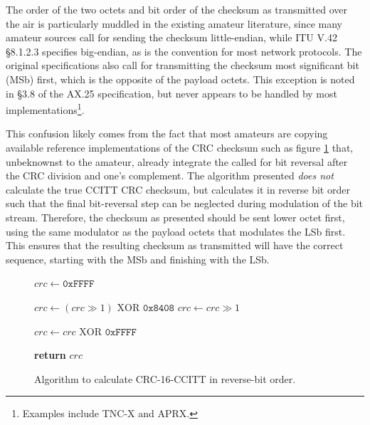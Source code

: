 \documentclass[12pt,letterpaper]{article}
\begin{document}
The order of the two octets and bit order of the checksum 
as transmitted over the air 
is particularly muddled in the existing amateur literature, 
since many amateur sources call for sending the
checksum little-endian, while ITU V.42 \S8.1.2.3 specifies big-endian,
as is the convention for most network protocols.
The original specifications also call for transmitting the checksum most
significant bit (MSb) first, which is the opposite of the payload octets.
This exception is noted in \S3.8 of the AX.25 specification, 
but never appears to be handled by most implementations\footnote{Examples
include TNC-X and APRX.}.

This confusion likely comes from the fact that most amateurs are copying
available reference implementations of the CRC checksum such as
figure \ref{fig:crcccittcode} that,
unbeknownst to the amateur, already integrate the called for bit reversal 
after the CRC division and one's complement.
The algorithm presented \emph{does not} calculate the true CCITT CRC checksum, but
calculates it in reverse bit order such that the final bit-reversal step 
can be neglected during modulation of the bit stream.
Therefore, the checksum as presented should be sent lower octet first, 
using the same modulator as the payload octets that modulates the LSb first.
This ensures that the resulting checksum as transmitted will have the 
correct sequence, starting with the MSb and finishing with the LSb.


\begin{figure}
	\begin{algorithmic}[1]
		\State $crc \gets \texttt{0xFFFF}$

			\State $crc \gets (crc \gg 1) \textrm{ XOR } \texttt{0x8408}$
		\Else
			\State $crc \gets crc \gg 1$
		\EndIf
		\EndFor
		\EndFor

		\State $crc \gets crc \textrm{ XOR } \texttt{0xFFFF}$

		\State \textbf{return} $crc$
		\EndFunction
	\end{algorithmic}

	\caption{Algorithm to calculate CRC-16-CCITT in reverse-bit order.}
	\label{fig:crcccittcode}
\end{figure}
\end{document}
